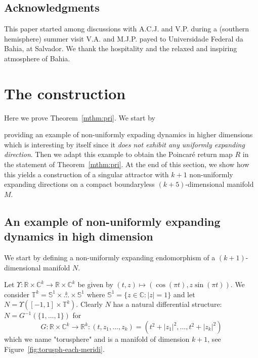 \documentclass[reqno,12pt,a4paper]{amsart}
\theoremstyle{plain}
\theoremstyle{definition}
\begin{document}
\subsection*{Acknowledgments}

This paper started among discussions with A.C.J. and
V.P. during a (southern hemisphere) summer visit V.A. and
M.J.P. payed to Universidade Federal da Bahia, at
Salvador. We thank the hospitality and the relaxed and
inspiring atmosphere of Bahia.

\section{The construction}
\label{sec:theconstruction}

Here we prove Theorem~\ref{mthm:pri}. We start by 
 
 
  
  
  
providing 
an example of non-uniformly expading dynamics
in higher dimensions which is interesting by itself since it
\emph{does not exhibit any uniformly expanding direction}. 
Then we adapt this example to obtain the Poincar\'e return map
$R$ in the statement of Theorem~\ref{mthm:pri}.
At the end of this section, we show how this yields a
construction of a singular attractor with $k+1$ non-uniformly
expanding directions on a compact boundaryless
$(k+5)$-dimensional manifold $M$.

\subsection{An example of non-uniformly expanding dynamics
  in high dimension}
\label{sec:an-example-nue}

We start by defining a non-uniformly expanding endomorphism
of a $(k+1)$- dimensional manifold $N$.

Let $\Upsilon:{{\mathbb R}}\times {{\mathbb C}}^{k} \to {{\mathbb R}}\times {{\mathbb C}}^{k}$ be
given by $(t, z)\mapsto (\cos(\pi t), z \sin(\pi t))$.  We
consider ${{\mathbb T}}^k={{\mathbb S}}^1 \times \overset{k}{\dots} \times
{{\mathbb S}}^1$ where ${{\mathbb S}}^1=\{z\in{{\mathbb C}}: |z|=1\}$ and let $N=
\Upsilon([-1,1]\times {{\mathbb T}}^{k})$.  Clearly $N$ has a natural
differential structure: $N=G^{-1}(\{1,\dots,1\})$ for
$$
G:{{\mathbb R}}\times{{\mathbb C}}^{k}\to{{\mathbb R}}^k:
(t,z_1,\dots,z_k)=(t^2+|z_1|^2,\dots,t^2+|z_k|^2)
$$
which we name "torusphere" and is a manifold of dimension
$k+1$, see Figure~\ref{fig:torusph-each-meridi}.
\end{document}
